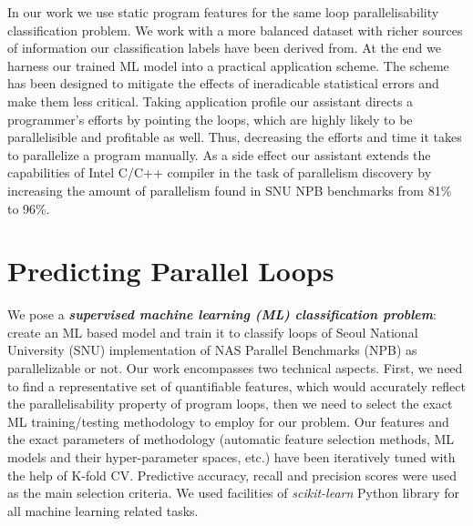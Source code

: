 \documentclass{acaces}
\begin{document}
\quad In our work we use static program features for the same loop parallelisability classification problem. We work with a more balanced dataset with richer sources of information our classification labels have been derived from. At the end we harness our trained ML model into a practical application scheme. The scheme has been designed to mitigate the effects of ineradicable statistical errors and make them less critical. Taking application profile our assistant directs a programmer's efforts by pointing the loops, which are highly likely to be parallelisible and profitable as well. Thus, decreasing the efforts and time it takes to parallelize a program manually. As a side effect our assistant extends the capabilities of Intel C/C++ compiler in the task of parallelism discovery by increasing the amount of parallelism found in SNU NPB benchmarks from 81\% to 96\%.

\section{Predicting Parallel Loops}
\label{predicting_parallel_loops}
\quad We pose a \textit{\textbf{supervised machine learning (ML) classification problem}}: create an ML based model and train it to classify loops of Seoul National University (SNU) implementation \cite{snu-npb-benchmarks} of NAS Parallel Benchmarks (NPB) \cite{nasa-parallel-benchmarks} as parallelizable or not.\newline\null
\quad Our work encompasses two technical aspects. First, we need to find a representative set of quantifiable features, which would accurately reflect the parallelisability property of program loops, then we need to select the exact ML training/testing methodology to employ for our problem.\newline\null
\quad Our features and the exact parameters of methodology (automatic feature selection methods, ML models and their hyper-parameter spaces, etc.) have been iteratively tuned with the help of K-fold CV. Predictive accuracy, recall and precision scores were used as the main selection criteria. We used facilities of \textit{scikit-learn} \cite{scikit-learn} Python library for all machine learning related tasks.
\end{document}

